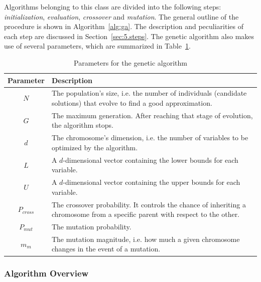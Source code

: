 Algorithms belonging to this class are divided into the following steps:
\textit{initialization}, \textit{evaluation}, \textit{crossover} and \textit{mutation}.
The general outline of the procedure is shown in Algorithm~\ref{alg:ga}.
The description and peculiarities of each step are discussed in Section~\ref{sec:5.steps}.
The genetic algorithm also makes use of several parameters, which are summarized
in Table~\ref{tab:ga_params}.

\begin{table}[]
	\centering
	\begin{tabularx}{\linewidth}{c X}
		\toprule
		\textbf{Parameter} & \textbf{Description} \\ \midrule
		$N$        & The population's size, i.e. the number of individuals (candidate solutions) that evolve to find a good approximation. \\
		$G$         & The maximum generation. After reaching that stage of evolution, the algorithm stops. \\
		$d$           	   & The chromosome's dimension, i.e. the number of variables to be optimized by the algorithm. \\
		$L$           	   & A $d$-dimensional vector containing the lower bounds for each variable. \\
		$U$				   & A $d$-dimensional vector containing the upper bounds for each variable. \\
		$P_{cross}$		   & The crossover probability. It controls the chance of inheriting a chromosome from a specific parent with respect to the other. \\
		$P_{mut}$		   & The mutation probability. \\
		$m_m$			   & The mutation magnitude, i.e. how much a given chromosome changes in the event of a mutation. \\ \bottomrule
	\end{tabularx}
	\caption{Parameters for the genetic algorithm}
	\label{tab:ga_params}
\end{table}

\subsubsection{Algorithm Overview}

